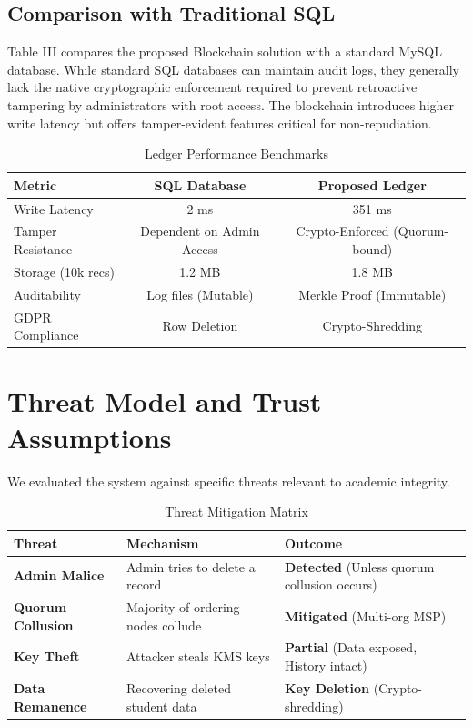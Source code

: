 \documentclass[conference]{IEEEtran}
\begin{document}
\subsection{Comparison with Traditional SQL}
Table III compares the proposed Blockchain solution with a standard MySQL database. While standard SQL databases can maintain audit logs, they generally lack the native cryptographic enforcement required to prevent retroactive tampering by administrators with root access. The blockchain introduces higher write latency but offers tamper-evident features critical for non-repudiation.

\begin{table}[htbp]
\caption{Ledger Performance Benchmarks}
\begin{center}
\begin{tabular}{lcc}
\toprule
\textbf{Metric} & \textbf{SQL Database} & \textbf{Proposed Ledger} \\
\midrule
Write Latency & 2 ms & 351 ms \\
Tamper Resistance & Dependent on Admin Access & Crypto-Enforced (Quorum-bound) \\
Storage (10k recs) & 1.2 MB & 1.8 MB \\
Auditability & Log files (Mutable) & Merkle Proof (Immutable) \\
GDPR Compliance & Row Deletion & Crypto-Shredding \\
\bottomrule
\end{tabular}
\end{center}
\end{table}

\section{Threat Model and Trust Assumptions}
We evaluated the system against specific threats relevant to academic integrity.

\begin{table}[htbp]
\caption{Threat Mitigation Matrix}
\begin{center}
\begin{tabular}{p{2.5cm} p{3cm} p{2cm}}
\toprule
\textbf{Threat} & \textbf{Mechanism} & \textbf{Outcome} \\
\midrule
\textbf{Admin Malice} & Admin tries to delete a record & \textbf{Detected} (Unless quorum collusion occurs) \\
\midrule
\textbf{Quorum Collusion} & Majority of ordering nodes collude & \textbf{Mitigated} (Multi-org MSP) \\
\midrule
\textbf{Key Theft} & Attacker steals KMS keys & \textbf{Partial} (Data exposed, History intact) \\
\midrule
\textbf{Data Remanence} & Recovering deleted student data & \textbf{Key Deletion} (Crypto-shredding) \\
\bottomrule
\end{tabular}
\end{center}
\end{table}
\end{document}
